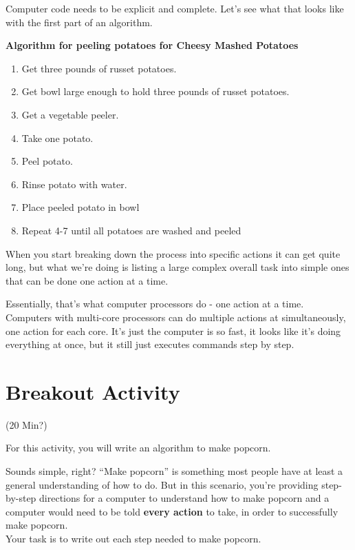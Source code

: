 \documentclass[
]{book}
\providecommand{\tightlist}{%
  \setlength{\itemsep}{0pt}\setlength{\parskip}{0pt}}
\begin{document}
Computer code needs to be explicit and complete. Let's see what that looks like with the first part of an algorithm.

\textbf{Algorithm for peeling potatoes for Cheesy Mashed Potatoes}

\begin{enumerate}
\def\labelenumi{\arabic{enumi}.}
\tightlist
\item
  Get three pounds of russet potatoes.
\item
  Get bowl large enough to hold three pounds of russet potatoes.
\item
  Get a vegetable peeler.
\item
  Take one potato.
\item
  Peel potato.
\item
  Rinse potato with water.
\item
  Place peeled potato in bowl
\item
  Repeat 4-7 until all potatoes are washed and peeled
\end{enumerate}

When you start breaking down the process into specific actions it can get quite long, but what we're doing is listing a large complex overall task into simple ones that can be done one action at a time.

Essentially, that's what computer processors do - one action at a time. Computers with multi-core processors can do multiple actions at simultaneously, one action for each core. It's just the computer is so fast, it looks like it's doing everything at once, but it still just executes commands step by step.

\section{Breakout Activity}\label{breakout-activity}

(20 Min?)

For this activity, you will write an algorithm to make popcorn.~

Sounds simple, right? ``Make popcorn'' is something most people have at least a general understanding of how to do. But in this scenario, you're providing step-by-step directions for a computer to understand how to make popcorn and a computer would need to be told \textbf{every action} to take, in order to successfully make popcorn.\\

Your task is to write out each step needed to make popcorn.
\end{document}
